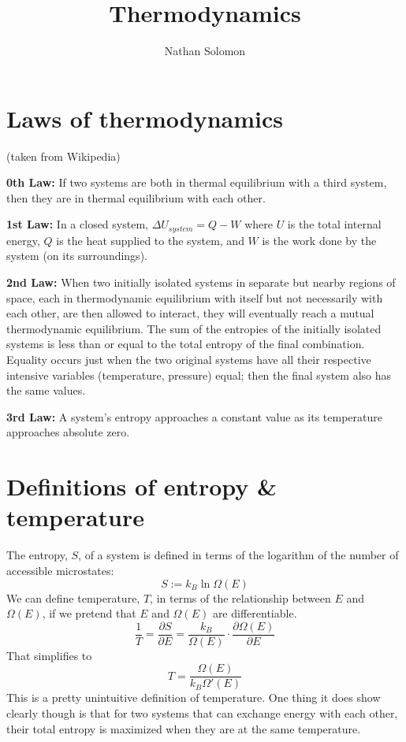 \documentclass[12pt]{article}
\begin{document}
\title{Thermodynamics}
\author{Nathan Solomon}
\maketitle

\section{Laws of thermodynamics}
(taken from Wikipedia)

\textbf{0th Law:} If two systems are both in thermal equilibrium with a third system, then they are in thermal equilibrium with each other.

\textbf{1st Law:} In a closed system, $\Delta U_{system} = Q - W$ where $U$ is the total internal energy, $Q$ is the heat supplied to the system, and $W$ is the work done by the system (on its surroundings).

\textbf{2nd Law:} When two initially isolated systems in separate but nearby regions of space, each in thermodynamic equilibrium with itself but not necessarily with each other, are then allowed to interact, they will eventually reach a mutual thermodynamic equilibrium. The sum of the entropies of the initially isolated systems is less than or equal to the total entropy of the final combination. Equality occurs just when the two original systems have all their respective intensive variables (temperature, pressure) equal; then the final system also has the same values.

\textbf{3rd Law:} A system's entropy approaches a constant value as its temperature approaches absolute zero.

\section{Definitions of entropy \& temperature}
The entropy, $S$, of a system is defined in terms of the logarithm of the number of accessible microstates:
\[S := k_B \ln{\Omega(E)}\]
We can define temperature, $T$, in terms of the relationship between $E$ and $\Omega(E)$, if we pretend that $E$ and $\Omega(E)$ are differentiable.
\[\frac{1}{T} = \frac{\partial S}{\partial E} = \frac{k_B}{\Omega(E)} \cdot \frac{\partial \Omega(E)}{\partial E}\]
That simplifies to
\[T = \frac{\Omega(E)}{k_B \Omega'(E)}\]
This is a pretty unintuitive definition of temperature. One thing it does show clearly though is that for two systems that can exchange energy with each other, their total entropy is maximized when they are at the same temperature.
\end{document}
